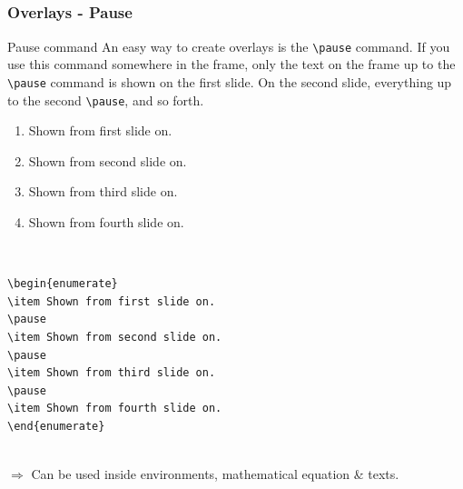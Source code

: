 \documentclass[[newPxFont]{beamer}
\begin{document}
\subsection{}
\begin{frame}[fragile]
  \frametitle{Overlays - Pause}
  \vspace{-.4cm}
  \begin{block}{Pause command}
  An easy way to create overlays is the \verb+\pause+ command.
If you use this command somewhere in the frame, only the text on the
frame up to the \verb+\pause+ command is shown on the first slide. On the
second slide, everything up to the second \verb+\pause+, and so forth.
  \end{block}
\begin{small}
\begin{minipage}{.475\textwidth}
\begin{enumerate}
\item Shown from first slide on.
\pause
\item Shown from second slide on.
\pause
\item Shown from third slide on.
\pause
\item Shown from fourth slide on.
\pause
\end{enumerate}
\end{minipage}%
\hfill
\begin{minipage}{.5\textwidth}
~
\begin{verbatim}
\begin{enumerate}
\item Shown from first slide on.
\pause
\item Shown from second slide on.
\pause
\item Shown from third slide on.
\pause
\item Shown from fourth slide on.
\end{enumerate}
\end{verbatim}
\end{minipage}

~\\
$\Rightarrow $ Can be used inside environments, mathematical equation \& texts.
\end{small}
\end{frame}
\end{document}
